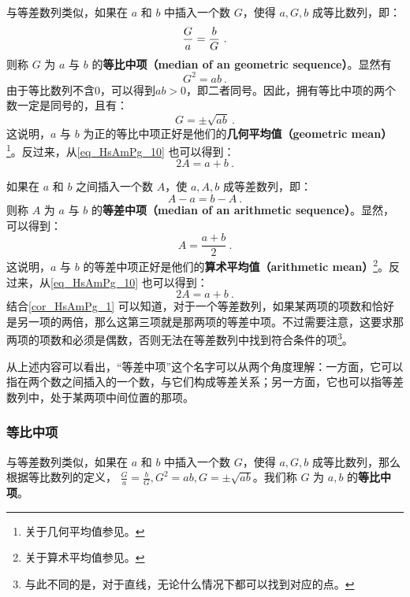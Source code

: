 与等差数列类似，如果在 $a$ 和 $b$ 中插入一个数 $G$，使得 $a,G,b$ 成等比数列，即：
\begin{equation}
{G\over a} = {b\over G}~.
\end{equation}
则称 $G$ 为 $a$ 与 $b$ 的\textbf{等比中项（median of an geometric sequence）}。显然有
\begin{equation}
G^2 = ab~.
\end{equation}
由于等比数列不含$0$，可以得到$ab>0$，即二者同号。因此，拥有等比中项的两个数一定是同号的，且有：
\begin{equation}
G = \pm \sqrt{ab}~.
\end{equation}
这说明，$a$ 与 $b$ 为正的等比中项正好是他们的\textbf{几何平均值（geometric mean）}\footnote{关于几何平均值参见。}。反过来，从\autoref{eq_HsAmPg_10} 也可以得到：
\begin{equation}
2A = a+b~.
\end{equation}


如果在 $a$ 和 $b$ 之间插入一个数 $A$，使 $a, A, b$ 成等差数列，即：
\begin{equation}
A - a = b - A~.
\end{equation}
则称 $A$ 为 $a$ 与 $b$ 的\textbf{等差中项（median of an arithmetic sequence）}。显然，可以得到：
\begin{equation}
A = \frac{a+b}{2}~.
\end{equation}
这说明，$a$ 与 $b$ 的等差中项正好是他们的\textbf{算术平均值（arithmetic mean）}\footnote{关于算术平均值参见。}。反过来，从\autoref{eq_HsAmPg_10} 也可以得到：
\begin{equation}
2A = a+b~.
\end{equation}
结合\autoref{cor_HsAmPg_1} 可以知道，对于一个等差数列，如果某两项的项数和恰好是另一项的两倍，那么这第三项就是那两项的等差中项。不过需要注意，这要求那两项的项数和必须是偶数，否则无法在等差数列中找到符合条件的项\footnote{与此不同的是，对于直线，无论什么情况下都可以找到对应的点。}。

从上述内容可以看出，“等差中项”这个名字可以从两个角度理解：一方面，它可以指在两个数之间插入的一个数，与它们构成等差关系；另一方面，它也可以指等差数列中，处于某两项中间位置的那项。
\subsubsection{等比中项}
与等差数列类似，如果在 $a$ 和 $b$ 中插入一个数 $G$，使得 $a,G,b$ 成等比数列，那么根据等比数列的定义， $\frac{G}{a} = \frac{b}{G},G^2 = ab,G = \pm \sqrt{ab}$。我们称 $G$ 为 $a,b$ 的\textbf{等比中项}。

